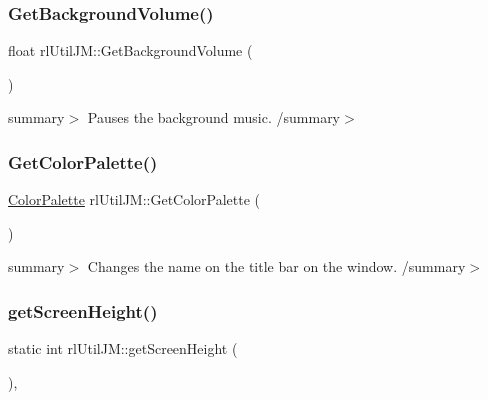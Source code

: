 \mbox{\label{classrl_util_j_m_a5e87185e9a310fa7a062f3a9dc1a8fe4}} 
\subsubsection{\texorpdfstring{Get\+Background\+Volume()}{GetBackgroundVolume()}}
{\footnotesize\ttfamily float rl\+Util\+J\+M\+::\+Get\+Background\+Volume (\begin{DoxyParamCaption}{ }\end{DoxyParamCaption})\hspace{0.3cm}{\ttfamily [static]}}

summary$>$ Pauses the background music. /summary$>$ \mbox{\label{classrl_util_j_m_a7c2712b6313fc11053bb2b85ba359a71}} 
\subsubsection{\texorpdfstring{Get\+Color\+Palette()}{GetColorPalette()}}
{\footnotesize\ttfamily \hyperlink{class_color_palette}{Color\+Palette} rl\+Util\+J\+M\+::\+Get\+Color\+Palette (\begin{DoxyParamCaption}{ }\end{DoxyParamCaption})\hspace{0.3cm}{\ttfamily [static]}}

summary$>$ Changes the name on the title bar on the window. /summary$>$ \mbox{\label{classrl_util_j_m_a6e984d89ab3e4c086561e3747f7ea4ac}} 
\subsubsection{\texorpdfstring{get\+Screen\+Height()}{getScreenHeight()}}
{\footnotesize\ttfamily static int rl\+Util\+J\+M\+::get\+Screen\+Height (\begin{DoxyParamCaption}{ }\end{DoxyParamCaption})\hspace{0.3cm}{\ttfamily [inline]}, {\ttfamily [static]}}

